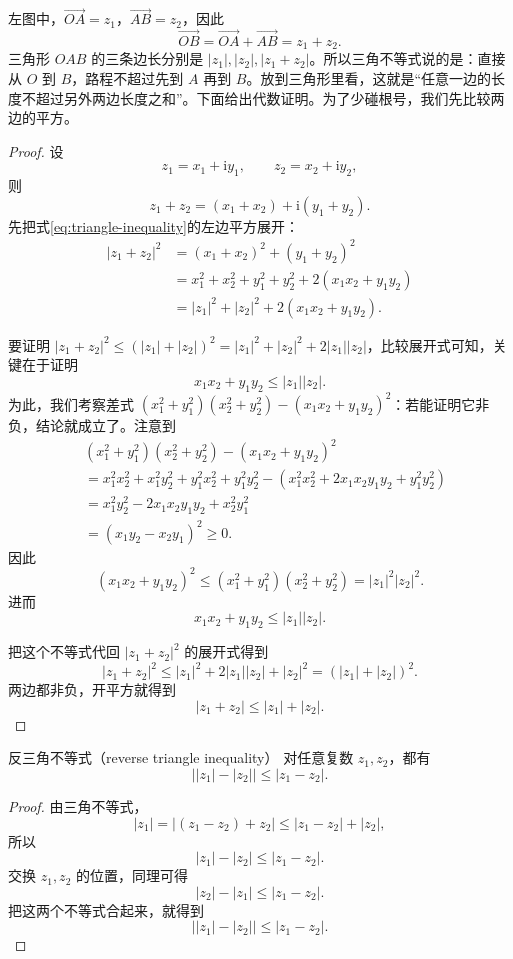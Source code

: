 左图中，$\overrightarrow{OA}=z_1$，$\overrightarrow{AB}=z_2$，因此
\[
\overrightarrow{OB}=\overrightarrow{OA}+\overrightarrow{AB}=z_1+z_2.
\]
三角形 $OAB$ 的三条边长分别是 $|z_1|,|z_2|,|z_1+z_2|$。所以三角不等式说的是：直接从 $O$ 到 $B$，路程不超过先到 $A$ 再到 $B$。放到三角形里看，这就是``任意一边的长度不超过另外两边长度之和''。下面给出代数证明。为了少碰根号，我们先比较两边的平方。

\begin{proof}
设
\[
z_1=x_1+\mathrm{i}y_1,\qquad z_2=x_2+\mathrm{i}y_2,
\]
则
\[
z_1 + z_2 = (x_1 + x_2) +\mathrm{i} (y_1+y_2).
\]
先把式\eqref{eq:triangle-inequality}的左边平方展开：
\[
\begin{aligned}
|z_1+z_2|^2
&=(x_1+x_2)^2+(y_1+y_2)^2\\
&=x_1^2+x_2^2+y_1^2+y_2^2+2(x_1x_2+y_1y_2)\\
&=|z_1|^2+|z_2|^2+2(x_1x_2+y_1y_2).
\end{aligned}
\]

要证明 $|z_1+z_2|^2\le (|z_1|+|z_2|)^2 =|z_1|^2+|z_2|^2+2|z_1||z_2|$，比较展开式可知，关键在于证明
\[
x_1x_2+y_1y_2\le |z_1||z_2|.
\]
为此，我们考察差式 $(x_1^2+y_1^2)(x_2^2+y_2^2)-(x_1x_2+y_1y_2)^2$：若能证明它非负，结论就成立了。注意到
\begin{align*}
    &(x_1^2+y_1^2)(x_2^2+y_2^2)-(x_1x_2+y_1y_2)^2 \\
    &=x_1^2x_2^2+x_1^2y_2^2+y_1^2x_2^2+y_1^2y_2^2-\left(x_1^2x_2^2+2x_1x_2y_1y_2+y_1^2y_2^2\right) \\
    &=x_1^2y_2^2-2x_1x_2y_1y_2+x_2^2y_1^2 \\
    &=(x_1y_2-x_2y_1)^2\ge 0.
\end{align*}
因此
\[
(x_1x_2+y_1y_2)^2\le (x_1^2+y_1^2)(x_2^2+y_2^2)=|z_1|^2|z_2|^2.
\]
进而
\[
x_1x_2+y_1y_2\le |z_1||z_2|.
\]

把这个不等式代回 $|z_1+z_2|^2$ 的展开式得到
\[
|z_1+z_2|^2\le |z_1|^2+2|z_1||z_2|+|z_2|^2=(|z_1|+|z_2|)^2.
\]
两边都非负，开平方就得到
\[
|z_1+z_2|\le |z_1|+|z_2|.
\]
\end{proof}

\begin{tuilun}{反三角不等式（reverse triangle inequality）}{}
对任意复数 $z_1,z_2$，都有
\begin{equation}
    \bigl||z_1|-|z_2|\bigr|\le |z_1-z_2|.
\end{equation}
\end{tuilun}

\begin{proof}
由三角不等式，
\[
|z_1|=|(z_1-z_2)+z_2|\le |z_1-z_2|+|z_2|,
\]
所以
\[
|z_1|-|z_2|\le |z_1-z_2|.
\]
交换 $z_1,z_2$ 的位置，同理可得
\[
|z_2|-|z_1|\le |z_1-z_2|.
\]
把这两个不等式合起来，就得到
\[
\bigl||z_1|-|z_2|\bigr|\le |z_1-z_2|.
\]
\end{proof}

